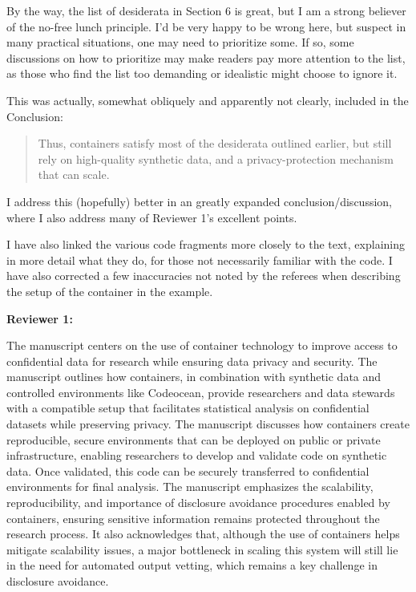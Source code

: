 \begin{referee}
By the way, the list of desiderata in
Section 6 is great,
but I am a strong believer of the no-free lunch principle. I'd be very happy to be wrong here, but
suspect in many practical situations, one may need to prioritize some. If so, some discussions on how
to prioritize may make readers pay more attention to the list, as those who find the list too
demanding or idealistic might choose to ignore it.

\end{referee}

\begin{response}
    This was actually, somewhat obliquely and apparently not clearly, included in the Conclusion:

    \begin{quote}
        Thus, containers satisfy most of the desiderata outlined earlier, but still rely on high-quality synthetic data, and a privacy-protection mechanism that can scale.
    \end{quote}
    
    
    \noindent I address this (hopefully) better in an greatly expanded conclusion/discussion, where I also address many of Reviewer 1's excellent points.

    \vspace{1em} I have also linked the various code fragments more closely to the text, explaining in more detail what they do, for those not necessarily familiar with the code. I have also corrected a few inaccuracies not noted by the referees when describing the setup of the container in the example.
\end{response}


\textbf{Reviewer 1:}

\begin{referee}
    
The manuscript centers on the use of container technology to improve access to confidential data for research while ensuring data privacy and security.  The manuscript outlines how containers, in combination with synthetic data and controlled environments like Codeocean, provide researchers and data stewards with a compatible setup that facilitates statistical analysis on confidential datasets while preserving privacy.  The manuscript discusses how containers create reproducible, secure environments that can be deployed on public or private infrastructure, enabling researchers to develop and validate code on synthetic data.  Once validated, this code can be securely transferred to confidential environments for final analysis.  The manuscript emphasizes the scalability, reproducibility, and importance of disclosure avoidance procedures enabled by containers, ensuring sensitive information remains protected throughout the research process.  It also acknowledges that, although the use of containers helps mitigate scalability issues, a major bottleneck in scaling this system will still lie in the need for automated output vetting, which remains a key challenge in disclosure avoidance.
\end{referee}

